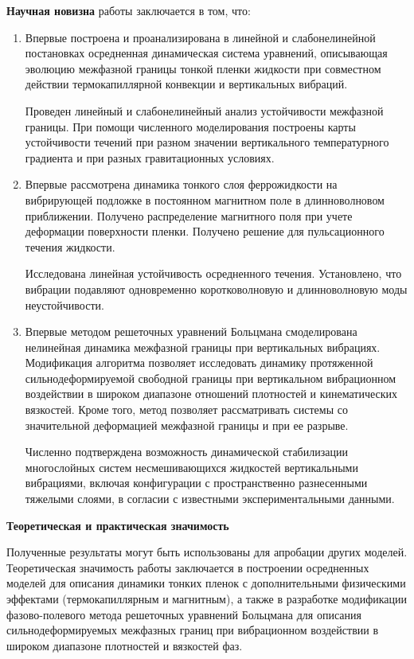 \documentclass[12pt,a4paper]{article}
\begin{document}
\textbf{Научная новизна} работы заключается в том, что:

\begin{enumerate}
	\item Впервые построена и проанализирована в линейной и слабонелинейной постановках осредненная динамическая система уравнений, описывающая эволюцию межфазной границы тонкой пленки жидкости при совместном действии термокапиллярной конвекции и вертикальных вибраций. 
	
	Проведен линейный и слабонелинейный анализ устойчивости межфазной границы. При помощи численного моделирования построены карты устойчивости течений при разном значении вертикального температурного градиента и при разных гравитационных условиях. 
	
	\item Впервые рассмотрена динамика тонкого слоя феррожидкости на вибрирующей подложке в постоянном магнитном поле в длинноволновом приближении. Получено распределение магнитного поля при учете деформации поверхности пленки. Получено решение для пульсационного течения жидкости. 
	
	Исследована линейная устойчивость осредненного течения. Установлено, что вибрации подавляют одновременно коротковолновую и длинноволновую моды неустойчивости.
	
	\item Впервые методом решеточных уравнений Больцмана смоделирована нелинейная динамика межфазной границы при вертикальных вибрациях. Модификация алгоритма позволяет исследовать динамику протяженной сильнодеформируемой свободной границы при вертикальном вибрационном воздействии в широком диапазоне отношений плотностей и кинематических вязкостей. Кроме того, метод позволяет рассматривать системы со значительной деформацией межфазной границы и при ее разрыве. 
	
	Численно подтверждена возможность динамической стабилизации многослойных систем несмешивающихся жидкостей вертикальными вибрациями, включая конфигурации с пространственно разнесенными тяжелыми слоями, в согласии с известными экспериментальными данными.
	
	
\end{enumerate}


\textbf{Теоретическая и практическая значимость}

Полученные результаты могут быть использованы для апробации других моделей. Теоретическая значимость работы заключается в построении осредненных моделей для описания динамики тонких пленок с дополнительными физическими эффектами (термокапиллярным и магнитным), а также в разработке модификации фазово-полевого метода решеточных уравнений Больцмана для описания сильнодеформируемых межфазных границ при вибрационном воздействии в широком диапазоне плотностей и вязкостей фаз.
\end{document}
